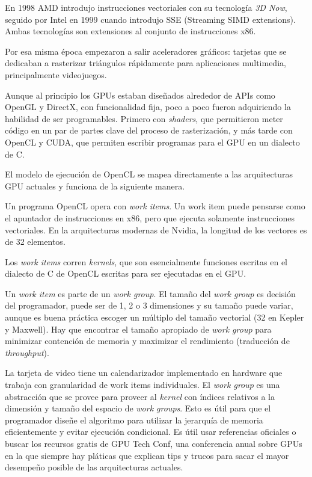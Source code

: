 En 1998 AMD introdujo instrucciones vectoriales con su tecnología \emph{3D
Now}, seguido por Intel en 1999 cuando introdujo SSE (Streaming SIMD
extensions). Ambas tecnologías son extensiones al conjunto de instrucciones x86.

Por esa misma época empezaron a salir aceleradores gráficos: tarjetas que se
dedicaban a rasterizar triángulos rápidamente para aplicaciones multimedia,
principalmente videojuegos.

Aunque al principio los GPUs estaban diseñados alrededor de APIs como OpenGL y
DirectX, con funcionalidad fija, poco a poco fueron adquiriendo la habilidad de
ser programables. Primero con \emph{shaders}, que permitieron meter código en
un par de partes clave del proceso de rasterización, y más tarde con OpenCL y
CUDA, que permiten escribir programas para el GPU en un dialecto de C.

El modelo de ejecución de OpenCL se mapea directamente a las arquitecturas GPU
actuales y funciona de la siguiente manera.

Un programa OpenCL opera con \emph{work items}. Un work item puede pensarse
como el apuntador de instrucciones en x86, pero que ejecuta solamente
instrucciones vectoriales. En la arquitecturas modernas de Nvidia, la longitud
de los vectores es de 32 elementos.

Los \emph{work items} corren \emph{kernels}, que son esencialmente funciones
escritas en el dialecto de C de OpenCL escritas para ser ejecutadas en el GPU.

Un \emph{work item} es parte de un \emph{work group}. El tamaño del \emph{work
group} es decisión del programador, puede ser de 1, 2 o 3 dimensiones y su
tamaño puede variar, aunque es buena práctica escoger un múltiplo del tamaño
vectorial (32 en Kepler y Maxwell). Hay que encontrar el tamaño apropiado de
\emph{work group} para minimizar contención de memoria y maximizar el
rendimiento (traducción de \emph{throughput}).

La tarjeta de video tiene un calendarizador implementado en hardware que
trabaja con granularidad de work items individuales. El \emph{work group} es
una abstracción que se provee para proveer al \emph{kernel} con índices
relativos a la dimensión y tamaño del espacio de \emph{work groups}. Esto es
útil para que el programador diseñe el algoritmo para utilizar la jerarquía de
memoria eficientemente y evitar ejecución condicional. Es útil usar referencias
oficiales \cite{maxwell-tuning} o buscar los recursos gratis de GPU Tech Conf,
una conferencia anual sobre GPUs en la que siempre hay pláticas que explican
tips y trucos para sacar el mayor desempeño posible de las arquitecturas
actuales. \cite{gtc}

